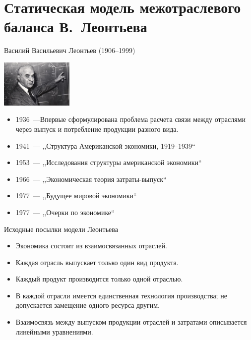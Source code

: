 \documentclass[unicode,11pt,notheorems,xcolor=table]{beamer}
\begin{document}
\section{Статическая модель межотраслевого баланса В.~Леонтьева}
\begin{frame}{Василий Васильевич Леонтьев (1906--1999)}

	\begin{minipage}{35mm}
		\noindent\includegraphics[width=35mm]{Leontyev.jpg}
	\end{minipage}
	\begin{minipage}{70mm}
	\end{minipage}

	\medskip
{\small	
\begin{itemize}
	\item 1936~---Впервые сформулирована проблема расчета связи между отраслями через выпуск и потребление  продукции разного вида.
	\item 1941~--- ,,Структура Американской экономики, 1919--1939``
	\item 1953~--- ,,Исследования структуры американской экономики``
	\item 1966~--- ,,Экономическая теория затраты-выпуск``
	\item 1977~--- ,,Будущее мировой экономики`` 
	\item 1977~--- ,,Очерки по экономике``
\end{itemize}\par}
\end{frame}	
\begin{frame}{Исходные посылки модели Леонтьева}
	\begin{itemize}
		\item Экономика состоит из  взаимосвязанных отраслей.
		\item Каждая отрасль выпускает только один вид продукта.
		\item Каждый продукт производится только одной отраслью.
		\item В каждой отрасли имеется единственная технология производства; не допускается замещение одного ресурса другим.
		\item \alert{Взаимосвязь между выпуском продукции отраслей и затратами описывается линейными уравнениями.}
	\end{itemize}
\end{frame}
\end{document}
